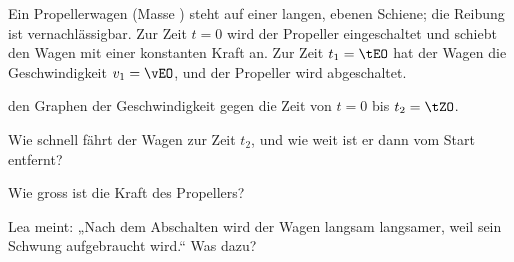 Ein Propellerwagen (Masse \mWO) steht auf einer langen, ebenen Schiene; die Reibung ist vernachlässigbar. Zur Zeit $t = 0$ wird der Propeller eingeschaltet und schiebt den Wagen mit einer konstanten Kraft an. Zur Zeit $t_1 = \tEO$ hat der Wagen die Geschwindigkeit $v_1 = \vEO$, und der Propeller wird abgeschaltet.

\begin{center}
\end{center}

\begin{abcliste}
\abc
{} den Graphen der Geschwindigkeit gegen die Zeit von $t = 0$ bis $t_2 = \tZO$.

\abc
Wie schnell fährt der Wagen zur Zeit $t_2$, und wie weit ist er dann vom Start entfernt?

\abc
Wie gross ist die Kraft des Propellers?

\abc
Lea meint: „Nach dem Abschalten wird der Wagen langsam langsamer, weil sein Schwung aufgebraucht wird.“ Was  dazu?
\end{abcliste}
